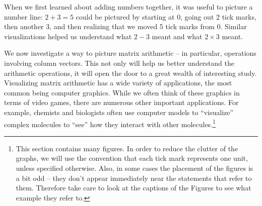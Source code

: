 When we first learned about adding numbers together, it was useful to picture a number line: $2+3=5$ could be pictured by starting at 0, going out 2 tick marks, then another 3, and then realizing that we moved 5 tick marks from 0. Similar visualizations helped us understand what $2-3$ meant and what $2\times 3$ meant.


We now investigate a way to picture matrix arithmetic -- in particular, operations involving column vectors. This not only will help us better understand the arithmetic operations, it will open the door to a great wealth of interesting study. Visualizing matrix arithmetic has a wide variety of applications, the most common being computer graphics. While we often think of these graphics in terms of video games, there are numerous other important applications. For example, chemists and biologists often use computer models to ``visualize'' complex molecules to ``see'' how they interact with other molecules.\footnote{This section contains many figures. In order to reduce the clutter of the graphs, we will use the convention that each tick mark represents one unit, unless specified otherwise. Also, in some cases the placement of the figures is a bit odd -- they don't appear immediately near the statements that refer to them. Therefore take care to look at the captions of the Figures to see what example they refer to.}\\

%
%
%
%
%

